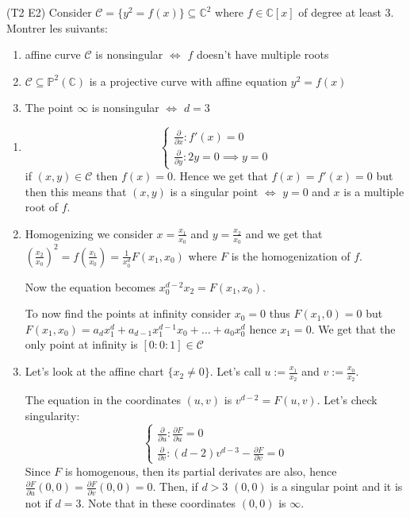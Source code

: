 \begin{eser}{(T2 E2)}
    Consider \(\mathcal{C} = \{y ^2 = f{(x)}\} \subseteq \mathbb{C}^2 \) where
    \(f \in  \mathbb{C}[x]\) of degree at least 3. Montrer les suivants:
\begin{enumerate}[label = (\arabic*)]
    \item affine curve \(\mathcal{C}\) is nonsingular \(\iff\) \(f\) doesn't
        have multiple roots
    \item  \(\mathcal{C} \subseteq \mathbb{P}^2{(\mathbb{C})} \) is a projective
        curve with affine equation \(y^2 = f{(x)}\) 
    \item The point \(\infty\) is nonsingular \(\iff\) \(d= 3\) 
\end{enumerate}
    \tcblower
\begin{enumerate}[label = (\arabic*)]
    \item \[
      \begin{cases}{}
          \frac{\partial }{\partial x} : f'{(x)} = 0\\
          \frac{\partial }{\partial y} : 2y = 0 \implies y = 0
      \end{cases}
    \]
    if \({(x, y)} \in \mathcal{C}\) then \(f{(x)} = 0\). Hence we get that
    \(f{(x)} = f'{(x)} = 0\) but then this means that \({(x, y)}\) is a singular
    point \(\iff\) \(y = 0\) and \(x\) is a multiple root of \(f\).
    \item Homogenizing we consider \(x = \frac{x_{1}}{x_{0}}\) and \(y =
        \frac{x_{2}}{x_{0}}\) and we get that \({\left(\frac{x_{2}}{x_{0}}\right)}^2 =
        f{\left(\frac{x_{1}}{x_{0}}\right)} = \frac{1}{x_{0}^{d}} F{(x_{1}, x_{0})}\) where
        \(F\) is the homogenization of \(f\).

        Now the equation becomes \(x_{0}^{d-2}x_{2} = F{(x_{1}, x_{0})}\).

        To now find the points at infinity consider \(x_{0}=0\) thus \(F{(x_{1},
        0)} = 0\) but \(F{(x_{1}, x_{0})} = a_d x_{1}^{d} + a_{d-1} x_{1}^{d-1} x_{0} + \dots 
        + a_{0} x_{0}^{d}\) hence \(x_{1}=0\). We get that the only point at
        infinity is \([0 : 0 : 1] \in  \mathcal{C}\) 
    \item Let's look at the affine chart \(\{x_{2} \neq 0\} \). Let's call \(u
        := \frac{x_{1}}{x_{2}}\) and \(v := \frac{x_{0}}{x_{2}}\).

        The equation in the coordinates \({(u,v)}\) is \(v^{d-2} = F{(u,v)}\).
        Let's check singularity:
        \[
          \begin{cases}{}
              \frac{\partial }{\partial u} : \frac{\partial F}{\partial u} = 0\\
              \frac{\partial }{\partial v} : {(d-2)}v^{d-3} - \frac{\partial
              F}{\partial v} = 0
          \end{cases}
        \]
        Since \(F\) is homogenous, then its partial derivates are also, hence
        \(\frac{\partial F}{\partial u} {(0, 0)} = \frac{\partial F}{\partial
        v}{(0,0)} = 0\). Then, if \(d > 3\) \({(0,0)}\) is a singular point and
        it is not if \(d = 3\). Note that in these coordinates \({(0,0)}\) is
        \(\infty\).


\end{enumerate}
\end{eser}
